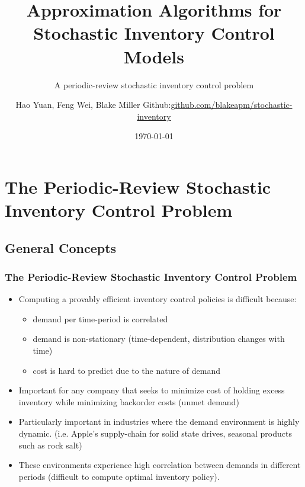 \documentclass{beamer}
\title{Approximation Algorithms for Stochastic Inventory Control Models}
\subtitle{A periodic-review stochastic inventory control problem}
\author[Hao Yuan, Feng Wei, Blake Miller]{Hao Yuan, Feng Wei, Blake Miller  {\ttfamily Github:\href{https://github.com/blakeapm/stochastic-inventory}{github.com/blakeapm/stochastic-inventory}}}
\date{\today}
\begin{document}
  \frame{\titlepage}
  \section{The Periodic-Review Stochastic Inventory Control Problem}
  \subsection{General Concepts}
  \begin{frame}
    \frametitle{The Periodic-Review Stochastic Inventory Control Problem}
    \begin{itemize}
      \item Computing a provably efficient inventory control policies is difficult because:
        \begin{itemize}
          \item demand per time-period is correlated
          \item demand is non-stationary (time-dependent, distribution changes with time)
          \item cost is hard to predict due to the nature of demand
        \end{itemize}
      \item Important for any company that seeks to minimize cost of holding excess inventory while minimizing backorder costs (unmet demand)
      \item Particularly important in industries where the demand environment is highly dynamic. (i.e. Apple's supply-chain for solid state drives, seasonal products such as rock salt)
      \item These environments experience high correlation between demands in different periods (difficult to compute optimal inventory policy).
    \end{itemize}
  \end{frame}
\end{document}

